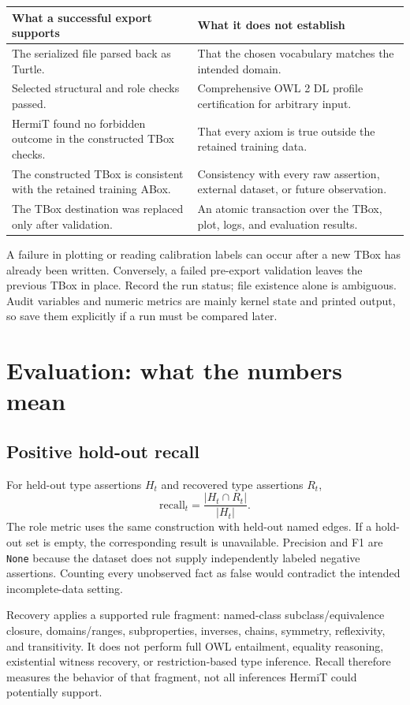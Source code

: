\documentclass[11pt,a4paper]{article}
\newcommand{\code}[1]{\nolinkurl{#1}}
\begin{document}
\begin{tabularx}{\textwidth}{@{}YY@{}}
\toprule
What a successful export supports & What it does not establish \\
\midrule
The serialized file parsed back as Turtle. & That the chosen vocabulary matches the intended domain. \\
Selected structural and role checks passed. & Comprehensive OWL 2 DL profile certification for arbitrary input. \\
HermiT found no forbidden outcome in the constructed TBox checks. & That every axiom is true outside the retained training data. \\
The constructed TBox is consistent with the retained training ABox. & Consistency with every raw assertion, external dataset, or future observation. \\
The TBox destination was replaced only after validation. & An atomic transaction over the TBox, plot, logs, and evaluation results. \\
\bottomrule
\end{tabularx}

A failure in plotting or reading calibration labels can occur after a new TBox
has already been written. Conversely, a failed pre-export validation leaves the
previous TBox in place. Record the run status; file existence alone is ambiguous.
Audit variables and numeric metrics are mainly kernel state and printed output,
so save them explicitly if a run must be compared later.

\section{Evaluation: what the numbers mean}\label{sec:evaluation}

\subsection{Positive hold-out recall}
For held-out type assertions $H_t$ and recovered type assertions $R_t$,
\[
  \mathrm{recall}_{t}=\frac{|H_t\cap R_t|}{|H_t|}.
\]
The role metric uses the same construction with held-out named edges. If a
hold-out set is empty, the corresponding result is unavailable. Precision and
F1 are \code{None} because the dataset does not supply independently labeled
negative assertions. Counting every unobserved fact as false would contradict
the intended incomplete-data setting.

Recovery applies a supported rule fragment: named-class subclass/equivalence
closure, domains/ranges, subproperties, inverses, chains, symmetry, reflexivity,
and transitivity. It does not perform full OWL entailment, equality reasoning,
existential witness recovery, or restriction-based type inference. Recall
therefore measures the behavior of that fragment, not all inferences HermiT
could potentially support.
\end{document}
